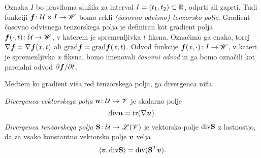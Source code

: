 Oznaka $I$ bo praviloma služila za interval $I=(t_1,t_2)\subset\mathbb R$, odprti ali zaprti. Tudi funkciji
$\boldsymbol f\colon \mathcal U\times I\to\mathscr W$ bomo rekli \emph{(časovno odvisno) tenzorsko polje}.
Gradient časovno odvisnega tenzorskega polja je definiran kot gradient polja
$\boldsymbol f(\cdot,t)\colon \mathcal U\to\mathscr W$, v katerem je spremenljivka $t$ fiksna. Označimo
ga enako, torej $\nabla\boldsymbol f=\nabla\boldsymbol f(x,t)$ ali $\mathrm{grad}\boldsymbol f=\mathrm{grad}\boldsymbol f(x,t)$.
Odvod funkcije $\boldsymbol f(x,\cdot)\colon I\to\mathscr W$, v kateri je spremenljivka $x$ fiksna,
bomo imenovali \emph{časovni odvod} in ga bomo označili kot parcialni odvod
$\partial\boldsymbol f/\partial t$.

Medtem ko gradient viša red tenzorskega polja, ga divergenca niža.
\begin{definicija} \label{def:div}
	\emph{Divergenca vektorskega polja} $\boldsymbol u\colon \mathcal U\to\mathscr V$ je skalarno polje
	\begin{equation} \label{e:div1}
		\mathrm{div}\boldsymbol u=\mathrm{tr}(\nabla\boldsymbol u).
	\end{equation}
	\emph{Divergenca tenzorskega polja} $\mathbf S\colon \mathcal U\to\mathscr L(\mathscr V)$ je vektorsko polje $\mathrm{div}\mathbf S$ z lastnostjo,
	da za vsako konstantno vektorsko polje $\boldsymbol v$ velja
	\begin{equation} \label{e:div2}
		\langle\boldsymbol v,\mathrm{div}\mathbf S\rangle = \mathrm{div}(\mathbf S^{T}\boldsymbol v).
	\end{equation}
\end{definicija}

